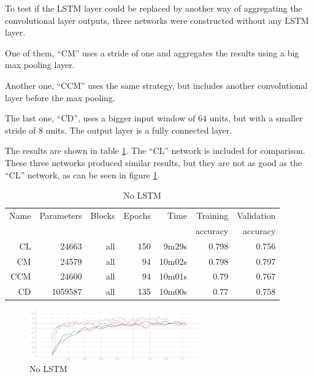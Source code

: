 To test if 
the LSTM layer could be replaced by 
another way of aggregating the convolutional layer outputs, three networks were constructed without any LSTM layer.

One of them, ``CM'' uses a stride of one and aggregates the results using a big max pooling layer.

Another one, ``CCM'' uses the same strategy, but includes another convolutional layer before the max pooling.

The last one, ``CD'', uses a bigger input window of 64 units, but with a smaller stride of 8 units. The output layer is a fully connected layer.

The results are shown in table \ref{tab:carvingnolstm}. The ``CL'' network is included for comparison.
These three networks produced similar results, but they are not as good as the ``CL'' network, as can be seen in figure
\ref{fig:nolstm}.


\begin{table}[!ht]
    \centering
    \caption{No LSTM}
    \label{tab:carvingnolstm}
\begin{tabular}{r|r|r|r|r|r|r}
\hline
Name & Parameters & Blocks & Epochs & Time & Training          & Validation          \\       
     &            &        &        &         &          accuracy &            accuracy \\ \hline\hline

CL	    & 24663	    & all	& 150	& 9m29s	    & 0.798	& 0.756 \\\hline
CM	    & 24579	    & all	& 94	& 10m02s	& 0.798	& 0.797 \\\hline
CCM	    & 24600	    & all	& 94	& 10m01s	& 0.79	& 0.767 \\\hline
CD	    & 1059587	& all	& 135	& 10m00s	& 0.77	& 0.758 \\\hline
\end{tabular}
\end{table}

\begin{figure}[htb!]
\centering\includegraphics[width=0.65\textwidth]{content/nolstm.png}
\caption{\label{fig:nolstm}No LSTM}%
\end{figure}

